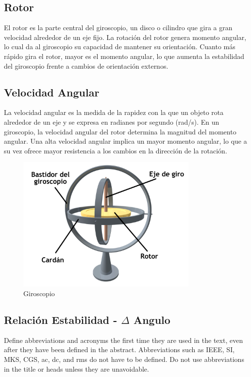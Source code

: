 \documentclass[conference]{IEEEtran}
\begin{document}
\subsection{Rotor}

El rotor es la parte central del giroscopio, un disco o cilindro que gira a gran velocidad alrededor de un eje fijo. La rotación del rotor genera momento angular, lo cual da al giroscopio su capacidad de mantener su orientación. Cuanto más rápido gira el rotor, mayor es el momento angular, lo que aumenta la estabilidad del giroscopio frente a cambios de orientación externos.

\subsection{Velocidad Angular}

La velocidad angular es la medida de la rapidez con la que un objeto rota alrededor de un eje y se expresa en radianes por segundo (rad/s). En un giroscopio, la velocidad angular del rotor determina la magnitud del momento angular. Una alta velocidad angular implica un mayor momento angular, lo que a su vez ofrece mayor resistencia a los cambios en la dirección de la rotación.


\begin{figure}[h!]
\centering
\includegraphics[width=9cm]{imagenes/gyroscopio.png}
\caption{Giroscopio}
\label{giroscopio}
\end{figure}

\subsection{Relación Estabilidad - $\Delta$ Angulo }\label{AA}
Define abbreviations and acronyms the first time they are used in the text, 
even after they have been defined in the abstract. Abbreviations such as 
IEEE, SI, MKS, CGS, ac, dc, and rms do not have to be defined. Do not use 
abbreviations in the title or heads unless they are unavoidable.
\end{document}

